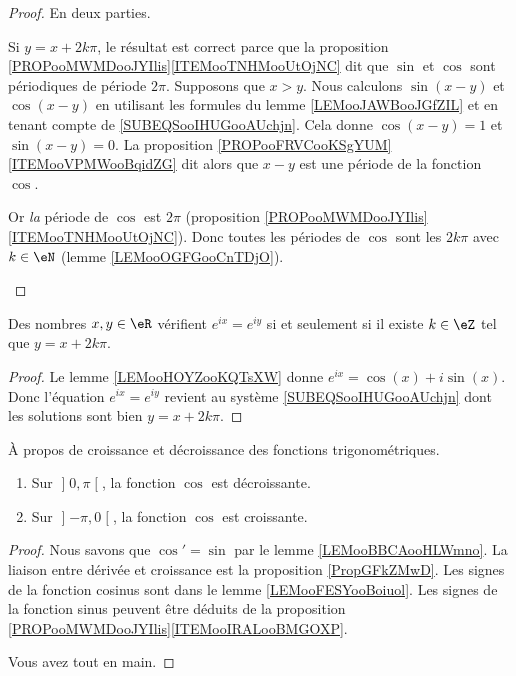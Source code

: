 \begin{proof}
	En deux parties.
	\begin{subproof}
		\spitem[\(  \Leftarrow\)]
		Si \( y=x+2k\pi\), le résultat est correct parce que la proposition \ref{PROPooMWMDooJYIlis}\ref{ITEMooTNHMooUtOjNC} dit que \( \sin\) et \( \cos\) sont périodiques de période \( 2\pi\).
		\spitem[\(  \Rightarrow\)]
		Supposons que \( x>y\). Nous calculons \( \sin(x-y)\) et \( \cos(x-y)\) en utilisant les formules du lemme \ref{LEMooJAWBooJGfZIL} et en tenant compte de \eqref{SUBEQSooIHUGooAUchjn}. Cela donne \( \cos(x-y)=1\) et \( \sin(x-y)=0\). La proposition \ref{PROPooFRVCooKSgYUM}\ref{ITEMooVPMWooBqidZG} dit alors que \( x-y\) est une période de la fonction \( \cos\).

		Or \emph{la} période de \( \cos\) est \( 2\pi\) (proposition \ref{PROPooMWMDooJYIlis}\ref{ITEMooTNHMooUtOjNC}). Donc toutes les périodes de \( \cos\) sont les \( 2k\pi\) avec \( k\in \eN\) (lemme \ref{LEMooOGFGooCnTDjO}).
	\end{subproof}
\end{proof}

\begin{corollary}   \label{CORooTFMAooHDRrqi}
	Des nombres \( x,y\in \eR\) vérifient \(  e^{ix}= e^{iy}\) si et seulement si il existe \( k\in\eZ\) tel que \( y=x+2k\pi\).
\end{corollary}

\begin{proof}
	Le lemme \ref{LEMooHOYZooKQTsXW} donne \(  e^{ix}=\cos(x)+i\sin(x)\). Donc l'équation \(  e^{ix}= e^{iy}\) revient au système \eqref{SUBEQSooIHUGooAUchjn} dont les solutions sont bien \( y=x+2k\pi\).
\end{proof}

\begin{lemma}        \label{LEMooBIPFooQNiTqZ}
	À propos de croissance et décroissance des fonctions trigonométriques.
	\begin{enumerate}
		\item
		      Sur \( \mathopen] 0 , \pi \mathclose[\), la fonction \( \cos\) est décroissante.
		\item
		      Sur \( \mathopen] -\pi , 0 \mathclose[\), la fonction \( \cos\) est croissante.
	\end{enumerate}
\end{lemma}

\begin{proof}
	Nous savons que \( \cos'=\sin\) par le lemme \ref{LEMooBBCAooHLWmno}. La liaison entre dérivée et croissance est la proposition \ref{PropGFkZMwD}. Les signes de la fonction cosinus sont dans le lemme \ref{LEMooFESYooBoiuol}. Les signes de la fonction sinus peuvent être déduits de la proposition \ref{PROPooMWMDooJYIlis}\ref{ITEMooIRALooBMGOXP}.

	Vous avez tout en main.
\end{proof}

